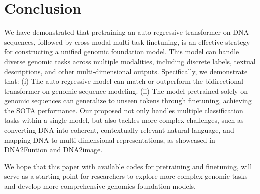 \section{Conclusion}
We have demonstrated that pretraining an auto-regressive transformer on DNA sequences, followed by cross-modal multi-task finetuning, is an effective strategy for constructing a unified genomic foundation model.
This model can handle diverse genomic tasks across multiple modalities, including discrete labels, textual descriptions, and other multi-dimensional outputs.
Specifically, we demonstrate that:
(i) The auto-regressive model can match or outperform the bidirectional transformer on genomic sequence modeling. (ii) The model pretrained solely on genomic sequences can generalize to unseen tokens through finetuning, achieving the SOTA performance. Our proposed \method not only handles  multiple classification tasks within a single model, but also tackles more complex challenges, such as converting DNA into coherent, contextually relevant natural language, and mapping DNA to multi-dimensional representations, as showcased in DNA2Funtion and DNA2image.


We hope that this paper with available codes for pretraining and finetuning, will serve as a starting point for researchers to explore more complex genomic tasks and develop more comprehensive genomics foundation models.


